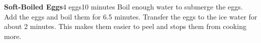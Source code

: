 \documentclass[../Cookbook.tex]{subfiles}
\begin{document}
\begin{recipe}[SoftBoiledEggs]{\textbf{Soft-Boiled Eggs}}{4 eggs}{10 minutes}
	Boil enough water to submerge the eggs.
	Add the eggs and boil them for 6.5 minutes.
	Transfer the eggs to the ice water for about 2 minutes. This makes them easier to peel and stops them from cooking more.
\end{recipe}
\end{document}
